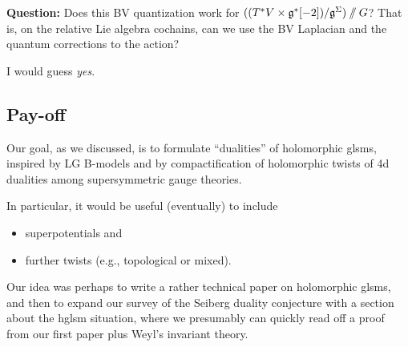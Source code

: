 \documentclass[11pt]{amsart}
\begin{document}
{\bf Question:} Does this BV quantization work for $((T^* V \times \mathfrak g^*[-2])/\mathfrak g^\Sigma)\mathbin{/\mkern-6mu/} G$? That is, on the relative Lie algebra cochains, can we use the BV Laplacian and the quantum corrections to the action?

I would guess {\it yes}.

\subsection{Pay-off}

Our goal, as we discussed, is to formulate ``dualities'' of holomorphic glsms, 
inspired by LG B-models and by compactification of holomorphic twists of 4d dualities among supersymmetric gauge theories.

In particular, it would be useful (eventually) to include
\begin{itemize}
\item superpotentials and
\item further twists (e.g., topological or mixed).
\end{itemize}
Our idea was perhaps to write a rather technical paper on holomorphic glsms, 
and then to expand our survey of the Seiberg duality conjecture with a section about the hglsm situation, where we presumably can quickly read off a proof from our first paper plus Weyl's invariant theory. 
\end{document}
